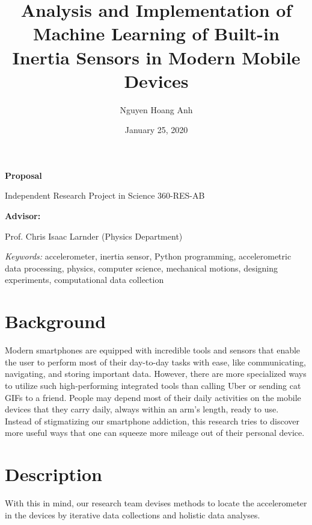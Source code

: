 \documentclass[11pt, a4paper]{article}
\author{Nguyen Hoang Anh}
\affil{John Abbott College, Sainte-Anne-de-Bellevue, Quebec\\ \email{hoanganh.theodore@icloud.com}}
\date{January 25, 2020}
\title{Analysis and Implementation of Machine Learning of Built-in Inertia Sensors in Modern Mobile Devices}
\begin{document}
    \maketitle

    \begin{center}
        \textbf{Proposal}

        Independent Research Project in Science 360-RES-AB       
    \end{center}
    \begin{center}
        \textbf{Advisor:}

        Prof. Chris Isaac Larnder (Physics Department)
    \end{center}
    \textit{Keywords:} accelerometer, inertia sensor, Python programming, accelerometric data processing, physics, computer science, mechanical motions, designing experiments, computational data collection

    \section{Background}
    Modern smartphones are equipped with incredible tools and sensors that enable the user to perform most of their day-to-day tasks with ease, like communicating, navigating, and storing important data. However, there are more specialized ways to utilize such high-performing integrated tools than calling Uber or sending cat GIFs to a friend. People may depend most of their daily activities on the mobile devices that they carry daily, always within an arm's length, ready to use. Instead of stigmatizing our smartphone addiction, this research tries to discover more useful ways that one can squeeze more mileage out of their personal device.
    \section{Description}
    With this in mind, our research team devises methods to locate the accelerometer in the devices by iterative data collections and holistic data analyses.
\end{document}
